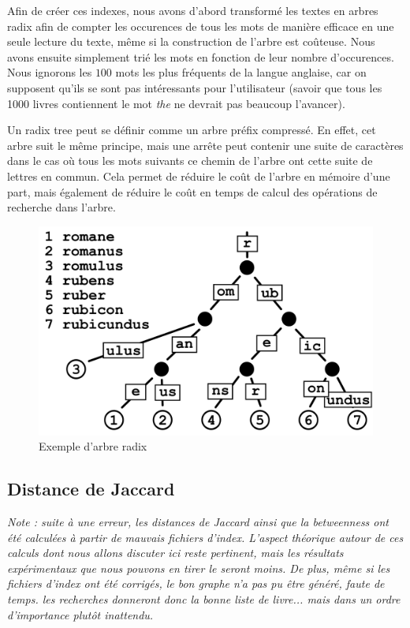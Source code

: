 \documentclass{article}
\begin{document}
Afin de créer ces indexes, nous avons d'abord transformé les textes en arbres radix afin de compter les occurences de tous les mots de manière efficace en une seule lecture du texte, même si la construction de l'arbre est coûteuse. Nous avons ensuite simplement trié les mots en fonction de leur nombre d'occurences. Nous ignorons les $100$ mots les plus fréquents de la langue anglaise, car on supposent qu'ils se sont pas intéressants pour l'utilisateur (savoir que tous les 1000 livres contiennent le mot \textit{the} ne devrait pas beaucoup l'avancer).

Un radix tree peut se définir comme un arbre préfix compressé. En effet, cet arbre suit le même principe, mais une arrête peut contenir une suite de caractères dans le cas où tous les mots suivants ce chemin de l'arbre ont cette suite de lettres en commun. Cela permet de réduire le coût de l'arbre en mémoire d'une part, mais également de réduire le coût en temps de calcul des opérations de recherche dans l'arbre.

\begin{figure}[!h]
  \centering
  \includegraphics[width=.3\paperwidth]{radix_tree.png}
  \caption{Exemple d'arbre radix}
\end{figure}

\subsection{Distance de Jaccard}

\textit{Note : suite à une erreur, les distances de Jaccard ainsi que la betweenness ont été calculées à partir de mauvais fichiers d'index. L'aspect théorique autour de ces calculs dont nous allons discuter ici reste pertinent, mais les résultats expérimentaux que nous pouvons en tirer le seront moins. De plus, même si les fichiers d'index ont été corrigés, le bon graphe n'a pas pu être généré, faute de temps. les recherches donneront donc la bonne liste de livre... mais dans un ordre d'importance plutôt inattendu.}\\
\end{document}

